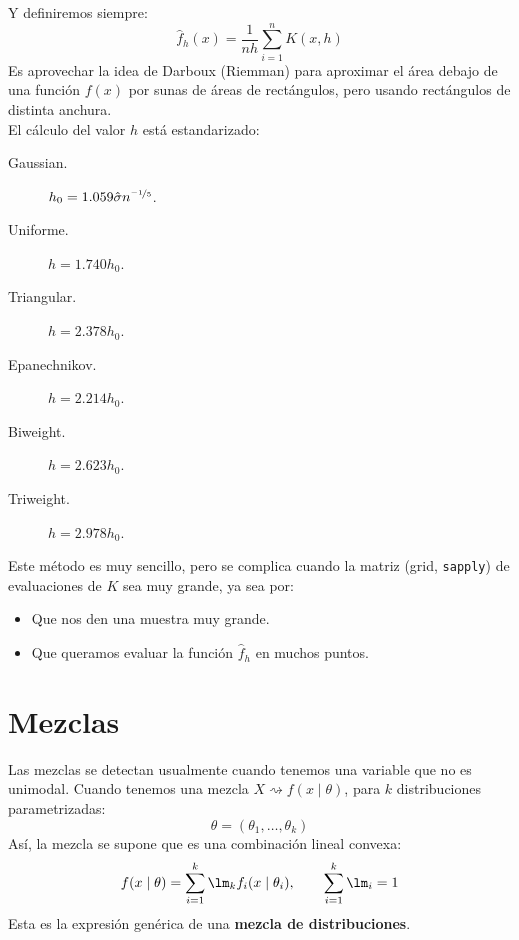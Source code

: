 Y definiremos siempre:
\begin{equation*}
    \hat{f}_h(x) = \frac{1}{nh} \sum_{i=1}^{n}K(x,h)
\end{equation*}
Es aprovechar la idea de Darboux (Riemman) para aproximar el área debajo de una función $f(x)$ por sunas de áreas de rectángulos, pero usando rectángulos de distinta anchura.\\

\noindent
El cálculo del valor $h$ está estandarizado:
\begin{description}
    \item [Gaussian.] $h_0 = 1.059 \hat{\sigma} n^{\nicefrac{-1}{5}}$.
    \item [Uniforme.]$h=1.740 h_0$.
    \item [Triangular.]$h=2.378 h_0$.
    \item [Epanechnikov.]$h=2.214 h_0$.
    \item [Biweight.]$h=2.623 h_0$.
    \item [Triweight.]$h=2.978 h_0$.
\end{description}


\noindent
Este método es muy sencillo, pero se complica cuando la matriz (grid, \texttt{sapply}) de evaluaciones de $K$ sea muy grande, ya sea por:
\begin{itemize}
    \item Que nos den una muestra muy grande.
    \item Que queramos evaluar la función $\hat{f}_h$ en muchos puntos.
\end{itemize}

\section{Mezclas}
\noindent
Las mezclas se detectan usualmente cuando tenemos una variable que no es unimodal. Cuando tenemos una mezcla $X\rightsquigarrow f(x\mid \theta)$, para $k$ distribuciones parametrizadas:
\begin{equation*}
    \theta = (\theta_1, \ldots, \theta_k)
\end{equation*}
Así, la mezcla se supone que es una combinación lineal convexa:
\begin{equation*}
    f(x\mid \theta) = \sum_{i=1}^{k} \lm_k f_i(x\mid \theta_i), \qquad \sum_{i=1}^{k}\lm_i = 1
\end{equation*}
Esta es la expresión genérica de una \textbf{mezcla de distribuciones}.

